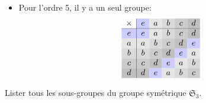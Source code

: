 {\begin{td-sol}[]
\begin{itemize}
\begin{equation*}
\begin{array}{c|cccc}
                    \cellcolor{gray!20}a & \cellcolor{gray!20}a & \cellcolor{blue!20}e & \cellcolor{gray!40}c & \cellcolor{gray!30}b \\
                    \cellcolor{gray!30}b & \cellcolor{gray!30}b & \cellcolor{gray!40}c & \cellcolor{blue!20}e & \cellcolor{gray!20}a \\
                    \cellcolor{gray!40}c & \cellcolor{gray!40}c & \cellcolor{gray!30}b & \cellcolor{gray!20}a & \cellcolor{blue!20}e \\
                \end{array}
            \end{equation*}

            \item Pour l'ordre 5, il y a un seul groupe:
            \begin{equation*}
                \begin{array}{c|ccccc} %
                    \times & \cellcolor{blue!20}e & \cellcolor{gray!20}a & \cellcolor{gray!30}b & \cellcolor{gray!40}c & \cellcolor{gray!50}d \\
                    \hline %
                    \cellcolor{blue!20}e & \cellcolor{blue!20}e & \cellcolor{gray!20}a & \cellcolor{gray!30}b & \cellcolor{gray!40}c & \cellcolor{gray!50}d \\
                    \cellcolor{gray!20}a & \cellcolor{gray!20}a & \cellcolor{gray!30}b & \cellcolor{gray!40}c & \cellcolor{gray!50}d & \cellcolor{blue!20}e \\
                    \cellcolor{gray!30}b & \cellcolor{gray!30}b & \cellcolor{gray!40}c & \cellcolor{gray!50}d & \cellcolor{blue!20}e & \cellcolor{gray!20}a \\
                    \cellcolor{gray!40}c & \cellcolor{gray!40}c & \cellcolor{gray!50}d & \cellcolor{blue!20}e & \cellcolor{gray!20}a & \cellcolor{gray!30}b \\
                    \cellcolor{gray!50}d & \cellcolor{gray!50}d & \cellcolor{blue!20}e & \cellcolor{gray!20}a & \cellcolor{gray!30}b & \cellcolor{gray!40}c \\
                \end{array}
            \end{equation*}
        \end{itemize}
    \end{td-sol}
}{}

\begin{td-exo} %
    Lister tous les sous-groupes du groupe symétrique \(\mathfrak{S}_3\).
\end{td-exo}

